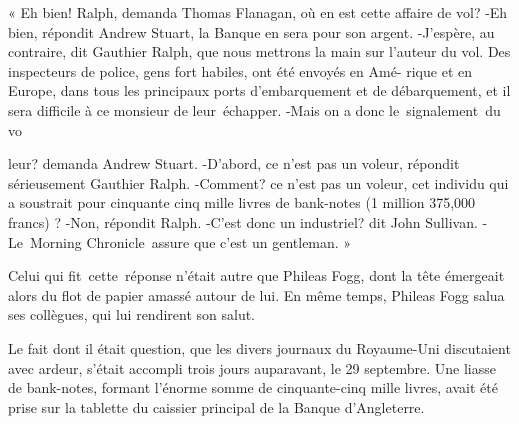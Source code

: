 \documentclass[]{book}
\begin{document}
               « Eh bien! Ralph, demanda Thomas
               Flanagan, où en est cette affaire de vol? \newline
               -Eh bien, répondit Andrew Stuart, la
               Banque en sera pour son argent.\newline
               -J'espère, au contraire, dit Gauthier 
               Ralph, que nous mettrons la main sur  
               l'auteur du vol. Des inspecteurs de police, 
               gens fort habiles, ont été envoyés en Amé- 
               rique et en Europe, dans tous les principaux ports d'embarquement et de débarquement, et il sera difficile à ce monsieur 
                de leur échapper.\newline
               -Mais on a donc le signalement du vo
               
                  
               leur? demanda Andrew Stuart.\newline
               -D'abord, ce n'est pas un voleur, répondit sérieusement Gauthier Ralph.\newline
               -Comment? ce n'est pas un voleur, cet
               individu qui a soustrait pour cinquante
               cinq mille livres de bank-notes (1 million
               375,000 francs) ?\newline
               -Non, répondit Ralph.\newline
               -C'est donc un industriel? dit John
               Sullivan.\newline
               -Le Morning Chronicle assure que c'est 
               un gentleman. »\newline
            
               Celui qui fit cette réponse n'était autre 
               que Phileas Fogg, dont la tête émergeait
               alors du flot de papier amassé autour de
               lui. En même temps, Phileas Fogg salua ses collègues, qui lui rendirent son 
               salut.
            
               Le fait dont il était question, que les divers journaux du Royaume-Uni discutaient avec ardeur, s'était accompli trois
               jours auparavant, le 29 septembre. Une 
               liasse de bank-notes, formant l'énorme 
               somme de cinquante-cinq mille livres,
               avait été prise sur la tablette du caissier
               principal de la Banque d'Angleterre.
            
\end{document}
